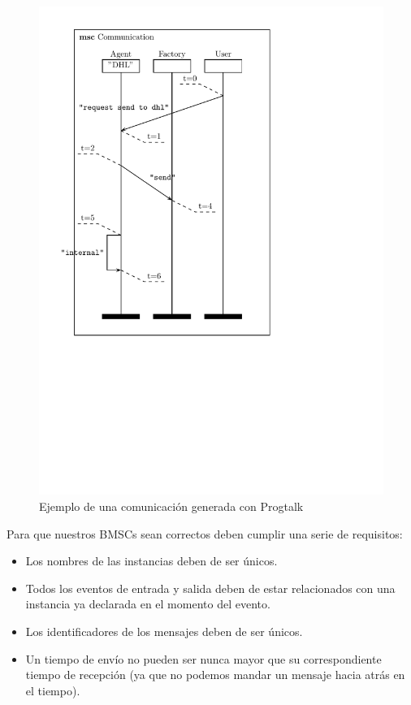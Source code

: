 \begin{figure}
  \centering
  \includegraphics[scale=1]{./images/lars}
  \caption{Ejemplo de una comunicación generada con Progtalk}
  \label{fig:fig5}
\end{figure}

Para que nuestros BMSCs sean correctos deben cumplir una serie de
requisitos:
\begin{itemize}
\item Los nombres de las instancias deben de ser únicos.
\item Todos los eventos de entrada y salida deben de estar
  relacionados con una instancia ya declarada en el momento del
  evento.
\item Los identificadores de los mensajes deben de ser únicos.
\item Un tiempo de envío no pueden ser nunca mayor que su
  correspondiente tiempo de recepción (ya que no podemos mandar un
  mensaje hacia atrás en el tiempo).
\end{itemize}


